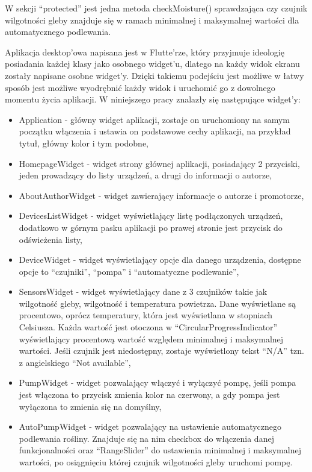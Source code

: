 \documentclass[a4paper,twoside,12pt]{book}
\begin{document}
W sekcji ``protected'' jest jedna metoda checkMoisture() sprawdzająca czy czujnik wilgotności gleby znajduje się w ramach minimalnej i maksymalnej wartości dla automatycznego podlewania.

Aplikacja desktop'owa napisana jest w Flutte'rze, który przyjmuje ideologię posiadania każdej klasy jako osobnego widget'u, dlatego na każdy widok ekranu zostały napisane osobne widget'y. Dzięki takiemu podejściu jest możliwe w łatwy sposób jest możliwe wyodrębnić każdy widok i uruchomić go z dowolnego momentu życia aplikacji. W niniejszego pracy znalazły się następujące widget'y:

\begin{itemize}
   \item Application - główny widget aplikacji, zostaje on uruchomiony na samym początku włączenia i ustawia on podstawowe cechy aplikacji, na przykład tytuł, główny kolor i tym podobne,
   \item HomepageWidget - widget strony głównej aplikacji, posiadający 2 przyciski, jeden prowadzący do listy urządzeń, a drugi do informacji o autorze,
   \item AboutAuthorWidget - widget zawierający informacje o autorze i promotorze,
   \item DevicesListWidget - widget wyświetlający listę podłączonych urządzeń, dodatkowo w górnym pasku aplikacji po prawej stronie jest przycisk do odświeżenia listy,
   \item DeviceWidget - widget wyświetlający opcje dla danego urządzenia, dostępne opcje to ``czujniki'', ``pompa'' i ``automatyczne podlewanie'',
   \item SensorsWidget - widget wyświetlający dane z 3 czujników takie jak wilgotność gleby, wilgotność i temperatura powietrza. Dane wyświetlane są procentowo, oprócz temperatury, która jest wyświetlana w stopniach Celsiusza. Każda wartość jest otoczona w ``CircularProgressIndicator'' wyświetlający procentową wartość względem minimalnej i maksymalnej wartości. Jeśli czujnik jest niedostępny, zostaje wyświetlony tekst ``N/A'' tzn. z angielskiego ``Not available'',
   \item PumpWidget - widget pozwalający włączyć i wyłączyć pompę, jeśli pompa jest włączona to przycisk zmienia kolor na czerwony, a gdy pompa jest wyłączona to zmienia się na domyślny,
   \item AutoPumpWidget - widget pozwalający na ustawienie automatycznego podlewania rośliny. Znajduje się na nim checkbox do włączenia danej funkcjonalności oraz ``RangeSlider'' do ustawienia minimalnej i maksymalnej wartości, po osiągnięciu której czujnik wilgotności gleby uruchomi pompę.
\end{itemize}
\end{document}
